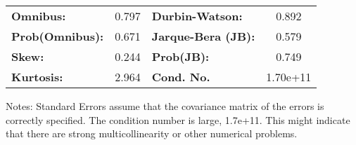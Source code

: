 \begin{center}
\begin{tabular}{lcccccc}
\bottomrule
\end{tabular}
\begin{tabular}{lclc}
\textbf{Omnibus:}       &  0.797 & \textbf{  Durbin-Watson:     } &    0.892  \\
\textbf{Prob(Omnibus):} &  0.671 & \textbf{  Jarque-Bera (JB):  } &    0.579  \\
\textbf{Skew:}          &  0.244 & \textbf{  Prob(JB):          } &    0.749  \\
\textbf{Kurtosis:}      &  2.964 & \textbf{  Cond. No.          } & 1.70e+11  \\
\bottomrule
\end{tabular}
\end{center}

Notes: \newline
 [1] Standard Errors assume that the covariance matrix of the errors is correctly specified. \newline
 [2] The condition number is large, 1.7e+11. This might indicate that there are \newline
 strong multicollinearity or other numerical problems.